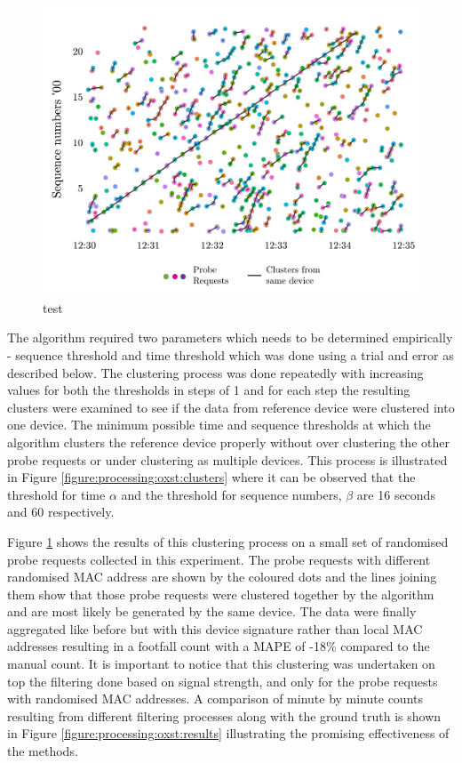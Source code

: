 \begin{figure}
  \includegraphics[trim={3 3 3 3},clip]{images/processing-oxst-fingerprinting.jpg}
  \caption{test}
  \label{figure:processing:oxst:fingerprinting}
\end{figure}

The algorithm required two parameters which needs to be determined empirically - sequence threshold and time threshold which was done using a trial and error as described below.
The clustering process was done repeatedly with increasing values for both the thresholds in steps of 1 and for each step the resulting clusters were examined to see if the data from reference device were clustered into one device.
The minimum possible time and sequence thresholds at which the algorithm clusters the reference device properly without over clustering the other probe requests or under clustering as multiple devices.
This process is illustrated in Figure \ref{figure:processing:oxst:clusters} where it can be observed that the threshold for time $\alpha$ and the threshold for sequence numbers, $\beta$ are 16 seconds and 60 respectively.

Figure \ref{figure:processing:oxst:fingerprinting} shows the results of this clustering process on a small set of randomised probe requests collected in this experiment.
The probe requests with different randomised MAC address are shown by the coloured dots and the lines joining them show that those probe requests were clustered together by the algorithm and are most likely be generated by the same device.
The data were finally aggregated like before but with this device signature rather than local MAC addresses resulting in a footfall count with a MAPE of -18\% compared to the manual count.
It is important to notice that this clustering was undertaken on top the filtering done based on signal strength, and only for the probe requests with randomised MAC addresses.
A comparison of minute by minute counts resulting from different filtering processes along with the ground truth is shown in Figure \ref{figure:processing:oxst:results} illustrating the promising effectiveness of the methods.

